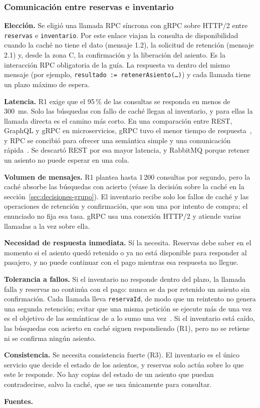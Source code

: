 \documentclass[11pt,a4paper]{article}
\newcommand{\decision}[8]{\subsubsection*{#1}%
  \textbf{Elección.} #2\par
  \textbf{Latencia.} #3\par
  \textbf{Volumen de mensajes.} #4\par
  \textbf{Necesidad de respuesta inmediata.} #5\par
  \textbf{Tolerancia a fallos.} #6\par
  \textbf{Consistencia.} #7\par
  \textbf{Fuentes.} #8\par}
\begin{document}
\decision{Comunicación entre reservas e inventario}
 {Se eligió una llamada RPC síncrona con gRPC sobre HTTP/2 entre \texttt{reservas} e \texttt{inventario}. Por este enlace viajan la consulta de disponibilidad cuando la caché no tiene el dato (mensaje 1.2), la solicitud de retención (mensaje 2.1) y, desde la zona C, la confirmación y la liberación del asiento. Es la interacción RPC obligatoria de la guía. La respuesta va dentro del mismo mensaje (por ejemplo, \texttt{resultado := retenerAsiento(\ldots)}) y cada llamada tiene un plazo máximo de espera.}
 {R1 exige que el 95\,\% de las consultas se responda en menos de 300~ms. Solo las búsquedas con fallo de caché llegan al inventario, y para ellas la llamada directa es el camino más corto. En una comparación entre REST, GraphQL y gRPC en microservicios, gRPC tuvo el menor tiempo de respuesta~\cite{niswar2024grpc}, y RPC se concibió para ofrecer una semántica simple y una comunicación rápida~\cite{birrell1984rpc}. Se descartó REST por esa mayor latencia, y RabbitMQ porque retener un asiento no puede esperar en una cola.}
 {R1 plantea hasta 1\,200 consultas por segundo, pero la caché absorbe las búsquedas con acierto (véase la decisión sobre la caché en la sección~\ref{sec:decisiones-grupo}). El inventario recibe solo los fallos de caché y las operaciones de retención y confirmación, que son una por intento de compra; el enunciado no fija esa tasa. gRPC usa una conexión HTTP/2 y atiende varias llamadas a la vez sobre ella.}
 {Sí la necesita. Reservas debe saber en el momento si el asiento quedó retenido o ya no está disponible para responder al pasajero, y no puede continuar con el pago mientras esa respuesta no llegue.}
 {Si el inventario no responde dentro del plazo, la llamada falla y reservas no continúa con el pago: nunca se da por retenido un asiento sin confirmación. Cada llamada lleva \texttt{reservaId}, de modo que un reintento no genera una segunda retención; evitar que una misma petición se ejecute más de una vez es el objetivo de las semánticas de a lo sumo una vez~\cite{liskov1991atmostonce}. Si el inventario está caído, las búsquedas con acierto en caché siguen respondiendo (R1), pero no se retiene ni se confirma ningún asiento.}
 {Se necesita consistencia fuerte (R3). El inventario es el único servicio que decide el estado de los asientos, y reservas solo actúa sobre lo que este le responde. No hay copias del estado de un asiento que puedan contradecirse, salvo la caché, que se usa únicamente para consultar.}
 {\cite{birrell1984rpc,niswar2024grpc,liskov1991atmostonce}}
\end{document}
